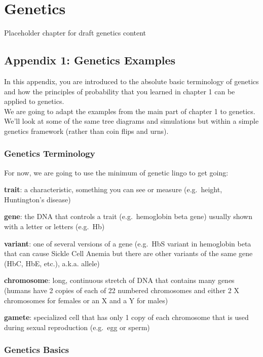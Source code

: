 \documentclass[]{book}
\theoremstyle{definition}
\theoremstyle{definition}
\theoremstyle{definition}
\theoremstyle{remark}
\begin{document}
\chapter{Genetics}\label{genetics}

Placeholder chapter for draft genetics content

\section{Appendix 1: Genetics
Examples}\label{appendix-1-genetics-examples}

In this appendix, you are introduced to the absolute basic terminology
of genetics and how the principles of probability that you learned in
chapter 1 can be applied to genetics.\\
We are going to adapt the examples from the main part of chapter 1 to
genetics. We'll look at some of the same tree diagrams and simulations
but within a simple genetics framework (rather than coin flips and
urns).

\subsection{Genetics Terminology}\label{genetics-terminology}

For now, we are going to use the minimum of genetic lingo to get going:

\textbf{trait}: a characteristic, something you can see or measure
(e.g.~height, Huntington's disease)

\textbf{gene}: the DNA that controls a trait (e.g.~hemoglobin beta gene)
usually shown with a letter or letters (e.g.~Hb)

\textbf{variant}: one of several versions of a gene (e.g.~HbS variant in
hemoglobin beta that can cause Sickle Cell Anemia but there are other
variants of the same gene (HbC, HbE, etc.), a.k.a. allele)

\textbf{chromosome}: long, continuous stretch of DNA that contains many
genes (humans have 2 copies of each of 22 numbered chromosomes and
either 2 X chromosomes for females or an X and a Y for males)

\textbf{gamete}: specialized cell that has only 1 copy of each
chromosome that is used during sexual reproduction (e.g.~egg or sperm)

\subsection{Genetics Basics}\label{genetics-basics}
\end{document}
